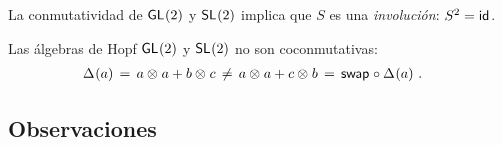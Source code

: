 
La conmutatividad de $\mathsf{GL}_{}(2)$ y $\mathsf{SL}_{}(2)$ implica que $S$ es una
\emph{involuci\'{o}n}: $S^2=\mathsf{id}_{}$.

\begin{obsGeneralLinealNoEsCoconmutativa}%
	\label{obs:generallinealnoescoconmutativa}
	Las \'{a}lgebras de Hopf $\mathsf{GL}_{}(2)$ y $\mathsf{SL}_{}(2)$ no son coconmutativas:
	\begin{align*}
		\Delta_{}(a) & \,=\,a\otimes_{} a+b\otimes_{} c \,\not=\,
			a\otimes_{} a+c\otimes_{} b\,=\,\mathsf{swap}_{}\circ\Delta_{}(a)
		\text{ .}
	\end{align*}
\end{obsGeneralLinealNoEsCoconmutativa}

\subsection{Observaciones}\label{subsec:hopf:observaciones}

